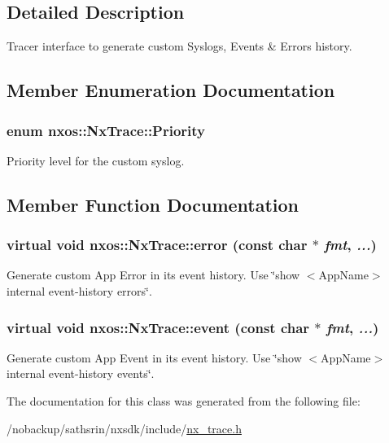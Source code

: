 \subsection{Detailed Description}
Tracer interface to generate custom Syslogs, Events \& Errors history. 

\subsection{Member Enumeration Documentation}
\hypertarget{classnxos_1_1NxTrace_a582f6e5a22e788c61807657f8bca088f}{
\subsubsection[{Priority}]{\setlength{\rightskip}{0pt plus 5cm}enum {\bf nxos::NxTrace::Priority}}}
\label{classnxos_1_1NxTrace_a582f6e5a22e788c61807657f8bca088f}
Priority level for the custom syslog. 

\subsection{Member Function Documentation}
\hypertarget{classnxos_1_1NxTrace_afc0240b6b9a291729836ffb2fbeef8a4}{
\subsubsection[{error}]{\setlength{\rightskip}{0pt plus 5cm}virtual void nxos::NxTrace::error (const char $\ast$ {\em fmt}, \/   {\em ...})}}
\label{classnxos_1_1NxTrace_afc0240b6b9a291729836ffb2fbeef8a4}
Generate custom App Error in its event history. Use \char`\"{}show $<$AppName$>$ internal event-\/history errors\char`\"{}. \hypertarget{classnxos_1_1NxTrace_a22e5e2fff39fae68fba3051dc2720621}{
\subsubsection[{event}]{\setlength{\rightskip}{0pt plus 5cm}virtual void nxos::NxTrace::event (const char $\ast$ {\em fmt}, \/   {\em ...})}}
\label{classnxos_1_1NxTrace_a22e5e2fff39fae68fba3051dc2720621}
Generate custom App Event in its event history. Use \char`\"{}show $<$AppName$>$ internal event-\/history events\char`\"{}. 

The documentation for this class was generated from the following file:\begin{DoxyCompactItemize}
\item 
/nobackup/sathsrin/nxsdk/include/\hyperlink{nx__trace_8h}{nx\_\-trace.h}\end{DoxyCompactItemize}
